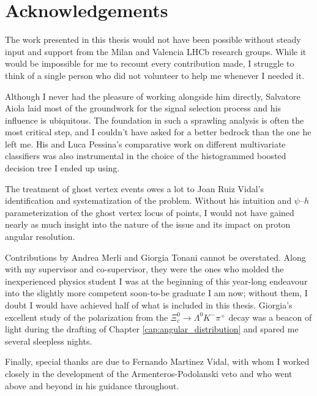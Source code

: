 \chapter*{Acknowledgements}

The work presented in this thesis would not have been possible without steady input and support from the Milan and Valencia LHCb research groups.
While it would be impossible for me to recount every contribution made, I struggle to think of a single person who did not volunteer to help me whenever I needed it. 

Although I never had the pleasure of working alongside him directly, Salvatore Aiola laid most of the groundwork for the \demonstratorshort signal selection process and his influence is ubiquitous.
The foundation in such a sprawling analysis is often the most critical step, and I couldn't have asked for a better bedrock than the one he left me.
His and Luca Pessina's comparative work on different multivariate classifiers was also instrumental in the choice of the histogrammed boosted decision tree I ended up using.

The treatment of ghost vertex \lambdadecay events owes a lot to Joan Ruiz Vidal's identification and systematization of the problem.
Without his intuition and $\psi$--$h$ parameterization of the ghost vertex locus of points, I would not have gained nearly as much insight into the nature of the issue and its impact on proton angular resolution.

Contributions by Andrea Merli and Giorgia Tonani cannot be overstated.
Along with my supervisor and co-supervisor, they were the ones who molded the inexperienced physics student I was at the beginning of this year-long endeavour into the slightly more competent soon-to-be graduate I am now;
without them, I doubt I would have achieved half of what is included in this thesis.
Giorgia's excellent study of the \lz polarization from the $\Xi_c^0 \rightarrow \Lambda^0 K^- \pi^+$ decay was a beacon of light during the drafting of Chapter \ref{cap:angular_distribution} and spared me several sleepless nights.

Finally, special thanks are due to Fernando Martinez Vidal, with whom I worked closely in the development of the Armenteros-Podolanski veto and who went above and beyond in his guidance throughout.